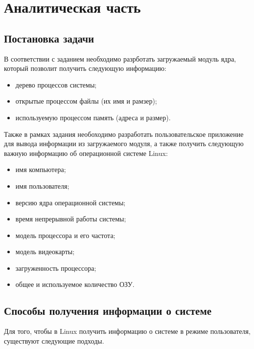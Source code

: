 \chapter{Аналитическая часть}

\section{Постановка задачи}

В соответствии с заданием необходимо разрботать загружаемый модуль ядра, который позволит получить следующую информацию:

\begin{itemize}
    \item дерево процессов системы;
    \item открытые процессом файлы (их имя и рамзер);
    \item используемую процессом память (адреса и размер).
\end{itemize}

Также в рамках задания необоходимо разработать пользовательское приложение для вывода информации из загружаемого модуля, а также получить следующую важную информацию об операционной системе Linux:

\begin{itemize}
    \item имя компьютера;
    \item имя пользователя;
    \item версию ядра операционной системы;
    \item время непрерывной работы системы;
    \item модель процессора и его частота;
    \item модель видеокарты;
    \item загруженность процессора;
    \item общее и используемое количество ОЗУ.
\end{itemize}


\section{Способы получения информации о системе}

Для того, чтобы в Linux получить информацию о системе в режиме пользователя, существуют следующие подходы.

